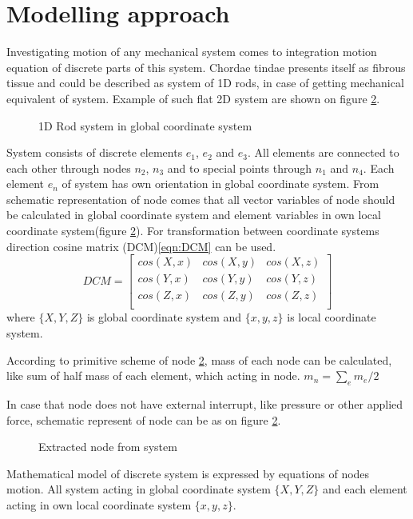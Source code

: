 \section*{Modelling approach}
Investigating motion of any mechanical system comes to integration motion
equation of discrete parts of this system. Chordae tindae presents itself as
fibrous tissue and could be described as system of 1D rods, in case of getting
mechanical equivalent of system. Example of such flat 2D system are shown on
figure \ref{fig:nodeExtract}.
\begin{figure}[H]\label{fig:rodSystem}
  \centering
  
  \caption{1D Rod system in global coordinate system}
\end{figure}
System consists of discrete elements $e_1$, $e_2$ and $e_3$. All elements are
connected to each other through nodes $n_2$, $n_3$ and to special points through
$n_1$ and $n_4$. Each element $e_n$ of system has own orientation in global
coordinate system. 
From schematic representation of node comes that all vector variables of node should be calculated
in global coordinate system and element variables in own local coordinate system(figure
\ref{fig:nodeExtract}). For transformation between coordinate systems direction cosine matrix
(DCM)\eqref{eqn:DCM} can be used.
\begin{equation}\label{eqn:DCM}
  DCM= \begin{bmatrix}
    cos(X,x) & cos(X,y) & cos(X,z) \\
    cos(Y,x) & cos(Y,y) & cos(Y,z) \\
    cos(Z,x) & cos(Z,y) & cos(Z,z) \\
  \end{bmatrix}
\end{equation}
where $\{X, Y, Z\}$ is global coordinate system and $\{x,y,z\}$ is local coordinate
system.\par According to primitive scheme of node \ref{fig:nodeExtract}, mass of
each node can be calculated, like sum of half mass of each element, which acting
in node. $m_n=\sum_{e}m_e/2$\par
In case that node does not have external interrupt, like pressure or other
applied force, schematic represent of node can be as on figure
\ref{fig:nodeExtract}.\par
\begin{figure}[H]
  \centering
  
  \caption{Extracted node from system}\label{fig:nodeExtract}
\end{figure}
Mathematical model of discrete system is expressed by equations of nodes motion.
All system acting in global coordinate system $\{X, Y, Z\}$ and each element acting
in own local coordinate system $\{x,y,z\}$.


